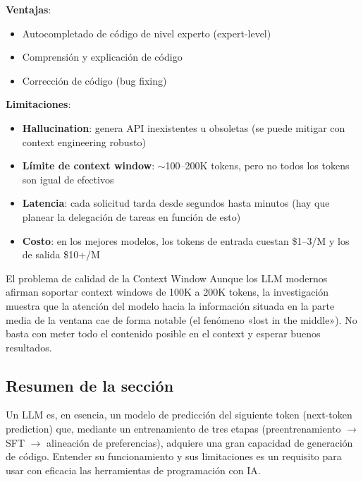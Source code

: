 \textbf{Ventajas}:
\begin{itemize}
    \item Autocompletado de código de nivel experto (expert-level)
    \item Comprensión y explicación de código
    \item Corrección de código (bug fixing)
\end{itemize}

\textbf{Limitaciones}:
\begin{itemize}
    \item \textbf{Hallucination}: genera API inexistentes u obsoletas (se puede mitigar con context engineering robusto)
    \item \textbf{Límite de context window}: $\sim$100--200K tokens, pero no todos los tokens son igual de efectivos
    \item \textbf{Latencia}: cada solicitud tarda desde segundos hasta minutos (hay que planear la delegación de tareas en función de esto)
    \item \textbf{Costo}: en los mejores modelos, los tokens de entrada cuestan \$1--3/M y los de salida \$10+/M
\end{itemize}

\begin{warningbox}{El problema de calidad de la Context Window}
Aunque los LLM modernos afirman soportar context windows de 100K a 200K tokens, la investigación muestra que la atención del modelo hacia la información situada en la parte media de la ventana cae de forma notable (el fenómeno «lost in the middle»). No basta con meter todo el contenido posible en el context y esperar buenos resultados.
\end{warningbox}

\subsection{Resumen de la sección}

Un LLM es, en esencia, un modelo de predicción del siguiente token (next-token prediction) que, mediante un entrenamiento de tres etapas (preentrenamiento $\rightarrow$ SFT $\rightarrow$ alineación de preferencias), adquiere una gran capacidad de generación de código. Entender su funcionamiento y sus limitaciones es un requisito para usar con eficacia las herramientas de programación con IA.
